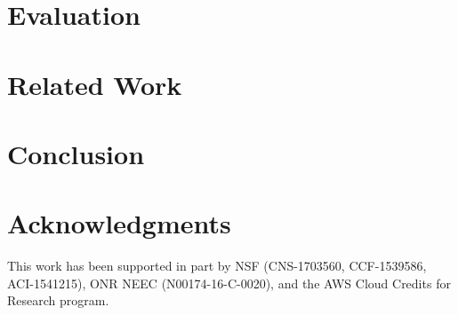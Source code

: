 \documentclass[10pt, conference]{IEEEtran}
\begin{document}
\section{Evaluation}
\label{sec:eval}


\section{Related Work}
\label{sec:relate_work}



\section{Conclusion}
\label{sec:conclusion}



\section*{Acknowledgments}
This work has been supported in part by NSF (CNS-1703560, CCF-1539586,
ACI-1541215), ONR NEEC (N00174-16-C-0020),
and the AWS Cloud Credits for Research program.




\end{document}
